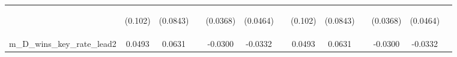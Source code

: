 \documentclass[]{article}
\begin{document}
\begin{center}
\begin{tabular}{lcccccccccccc}
\vspace{4pt} & \begin{footnotesize}(0.102)\end{footnotesize} & \begin{footnotesize}(0.0843)\end{footnotesize} & \begin{footnotesize}\end{footnotesize} & \begin{footnotesize}(0.0368)\end{footnotesize} & \begin{footnotesize}(0.0464)\end{footnotesize} & \begin{footnotesize}\end{footnotesize} & \begin{footnotesize}(0.102)\end{footnotesize} & \begin{footnotesize}(0.0843)\end{footnotesize} & \begin{footnotesize}\end{footnotesize} & \begin{footnotesize}(0.0368)\end{footnotesize} & \begin{footnotesize}(0.0464)\end{footnotesize} & \begin{footnotesize}\end{footnotesize} \\
m\_D\_wins\_key\_rate\_lead2 & 0.0493 & 0.0631 &  & -0.0300 & -0.0332 &  & 0.0493 & 0.0631 &  & -0.0300 & -0.0332 &  \\

\end{tabular}
\end{center}
\end{document}
